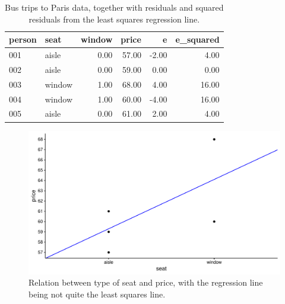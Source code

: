 \documentclass[]{book}\usepackage[]{graphicx}\usepackage[]{color}
\makeatletter
\def\maxwidth{ %
  \ifdim\Gin@nat@width>\linewidth
    \linewidth
  \else
    \Gin@nat@width
  \fi
}
\newenvironment{knitrout}{}{} %
\makeatother
\begin{document}
\begin{table}[ht]
\centering
\caption{Bus trips to Paris data, together with residuals and squared residuals from the least squares regression line.} 
\label{tab:dummy_5}
\begin{tabular}{llrrrr}
  \hline
person & seat & window & price & e & e\_squared \\ 
  \hline
001 & aisle & 0.00 & 57.00 & -2.00 & 4.00 \\ 
  002 & aisle & 0.00 & 59.00 & 0.00 & 0.00 \\ 
  003 & window & 1.00 & 68.00 & 4.00 & 16.00 \\ 
  004 & window & 1.00 & 60.00 & -4.00 & 16.00 \\ 
  005 & aisle & 0.00 & 61.00 & 2.00 & 4.00 \\ 
   \hline
\end{tabular}
\end{table}




\begin{knitrout}
\color{fgcolor}\begin{figure}

{\centering \includegraphics[width=\maxwidth]{figure/dummy_6-1} 

}

\caption[Relation between type of seat and price, with the regression line being not quite the least squares line]{Relation between type of seat and price, with the regression line being not quite the least squares line.}\label{fig:dummy_6}
\end{figure}


\end{knitrout}
\end{document}
